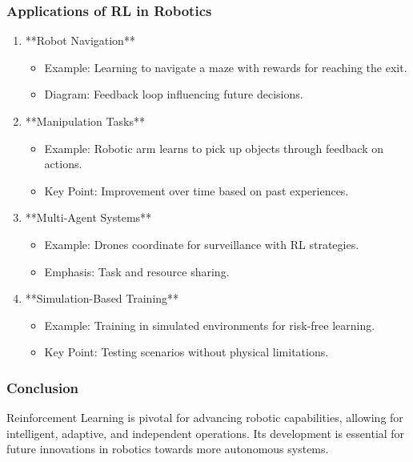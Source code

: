 \documentclass{beamer}
\begin{document}
\begin{frame}[fragile]
    \frametitle{Applications of RL in Robotics}
    \begin{enumerate}
        \item **Robot Navigation**
        \begin{itemize}
            \item Example: Learning to navigate a maze with rewards for reaching the exit.
            \item Diagram: Feedback loop influencing future decisions.
        \end{itemize}
        
        \item **Manipulation Tasks**
        \begin{itemize}
            \item Example: Robotic arm learns to pick up objects through feedback on actions.
            \item Key Point: Improvement over time based on past experiences.
        \end{itemize}

        \item **Multi-Agent Systems**
        \begin{itemize}
            \item Example: Drones coordinate for surveillance with RL strategies.
            \item Emphasis: Task and resource sharing.
        \end{itemize}

        \item **Simulation-Based Training**
        \begin{itemize}
            \item Example: Training in simulated environments for risk-free learning.
            \item Key Point: Testing scenarios without physical limitations.
        \end{itemize}
    \end{enumerate}
\end{frame}

\begin{frame}[fragile]
    \frametitle{Conclusion}
    Reinforcement Learning is pivotal for advancing robotic capabilities, allowing for intelligent, adaptive, and independent operations. Its development is essential for future innovations in robotics towards more autonomous systems.
\end{frame}
\end{document}
